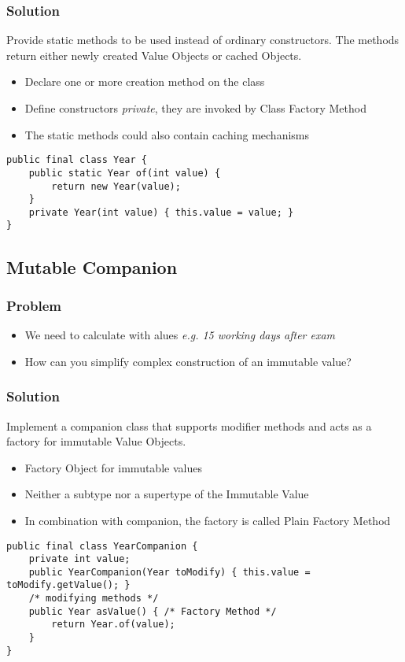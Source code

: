 \subsubsection{Solution}
Provide static methods to be used instead of ordinary constructors. The methods return either newly created Value Objects or cached Objects.
\begin{itemize}[topsep=0pt]
    \itemsep -0.4em
    \item Declare one or more creation method on the class
    \item Define constructors \textit{private}, they are invoked by Class Factory Method
    \item The static methods could also contain caching mechanisms
\end{itemize}
\begin{lstlisting}[style=htmlcssjs]
public final class Year {
    public static Year of(int value) {
        return new Year(value);
    }
    private Year(int value) { this.value = value; }
}
\end{lstlisting}

\subsection{Mutable Companion}
\subsubsection{Problem}
\begin{itemize}[topsep=0pt]
    \itemsep -0.4em
    \item We need to calculate with alues \textit{e.g. 15 working days after exam}
    \item How can you simplify complex construction of an immutable value?
\end{itemize}
\subsubsection{Solution}
Implement a companion class that supports modifier methods and acts as a factory for immutable Value Objects.
\begin{itemize}[topsep=0pt]
    \itemsep -0.4em
    \item Factory Object for immutable values
    \item Neither a subtype nor a supertype of the Immutable Value
    \item In combination with companion, the factory is called Plain Factory Method
\end{itemize}
\begin{lstlisting}[style=htmlcssjs]
public final class YearCompanion {
    private int value;
    public YearCompanion(Year toModify) { this.value = toModify.getValue(); }
    /* modifying methods */
    public Year asValue() { /* Factory Method */
        return Year.of(value);
    }
}
\end{lstlisting}

